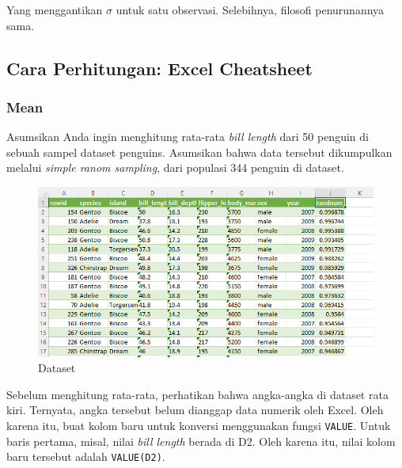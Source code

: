 \documentclass[
  letterpaper,
  DIV=11,
  numbers=noendperiod]{scrreprt}
\begin{document}
Yang menggantikan \(\sigma\) untuk satu observasi. Selebihnya, filosofi
penurunannya sama.

\hypertarget{cara-perhitungan-excel-cheatsheet}{%
\subsection{Cara Perhitungan: Excel
Cheatsheet}\label{cara-perhitungan-excel-cheatsheet}}

\hypertarget{mean-1}{%
\subsubsection{Mean}\label{mean-1}}

Asumsikan Anda ingin menghitung rata-rata \emph{bill length} dari 50
penguin di sebuah sampel dataset penguins. Asumsikan bahwa data tersebut
dikumpulkan melalui \emph{simple ranom sampling}, dari populasi 344
penguin di dataset.

\begin{figure}

{\centering \includegraphics{./count-1.png}

}

\caption{Dataset}

\end{figure}

Sebelum menghitung rata-rata, perhatikan bahwa angka-angka di dataset
rata kiri. Ternyata, angka tersebut belum dianggap data numerik oleh
Excel. Oleh karena itu, buat kolom baru untuk konversi menggunakan
fungsi \texttt{VALUE}. Untuk baris pertama, misal, nilai \emph{bill
length} berada di D2. Oleh karena itu, nilai kolom baru tersebut adalah
\texttt{VALUE(D2)}.
\end{document}
